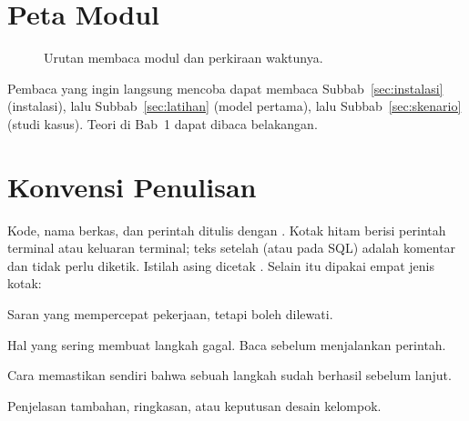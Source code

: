 \section*{Peta Modul}
\begin{figure}[H]
\centering
{}
\caption{Urutan membaca modul dan perkiraan waktunya.}\label{fig:peta}
\end{figure}
Pembaca yang ingin langsung mencoba dapat membaca Subbab~\ref{sec:instalasi} (instalasi), lalu Subbab~\ref{sec:latihan} (model pertama), lalu Subbab~\ref{sec:skenario} (studi kasus). Teori di Bab~1 dapat dibaca belakangan.

\section*{Konvensi Penulisan}
Kode, nama berkas, dan perintah ditulis dengan . Kotak hitam berisi perintah terminal atau keluaran terminal; teks setelah \kode{\#} (atau \kode{--} pada SQL) adalah komentar dan tidak perlu diketik. Istilah asing dicetak . Selain itu dipakai empat jenis kotak:

\begin{tips}Saran yang mempercepat pekerjaan, tetapi boleh dilewati.\end{tips}
\begin{perhatian}Hal yang sering membuat langkah gagal. Baca sebelum menjalankan perintah.\end{perhatian}
\begin{cekberhasil}Cara memastikan sendiri bahwa sebuah langkah sudah berhasil sebelum lanjut.\end{cekberhasil}
\begin{info}Penjelasan tambahan, ringkasan, atau keputusan desain kelompok.\end{info}

